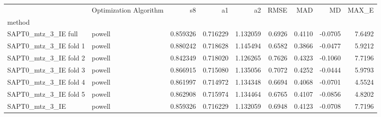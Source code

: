 \begin{tabular}{llrrrrrrr}
 & Optimization Algorithm & s8 & a1 & a2 & RMSE & MAD & MD & MAX_E \\
method &  &  &  &  &  &  &  &  \\
SAPT0_mtz_3_IE full & powell & 0.859326 & 0.716229 & 1.132059 & 0.6926 & 0.4110 & -0.0705 & 7.6492 \\
SAPT0_mtz_3_IE fold 1 & powell & 0.880242 & 0.718628 & 1.145494 & 0.6582 & 0.3866 & -0.0477 & 5.9212 \\
SAPT0_mtz_3_IE fold 2 & powell & 0.842349 & 0.718020 & 1.126265 & 0.7626 & 0.4323 & -0.1060 & 7.7196 \\
SAPT0_mtz_3_IE fold 3 & powell & 0.866915 & 0.715080 & 1.135056 & 0.7072 & 0.4252 & -0.0444 & 5.9793 \\
SAPT0_mtz_3_IE fold 4 & powell & 0.861997 & 0.714972 & 1.134348 & 0.6694 & 0.4068 & -0.0701 & 4.5524 \\
SAPT0_mtz_3_IE fold 5 & powell & 0.862908 & 0.715974 & 1.134464 & 0.6765 & 0.4107 & -0.0856 & 4.8202 \\
SAPT0_mtz_3_IE & powell & 0.859326 & 0.716229 & 1.132059 & 0.6948 & 0.4123 & -0.0708 & 7.7196 \\
\end{tabular}
